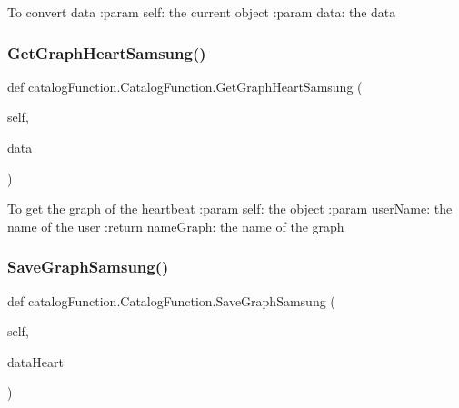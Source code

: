 \begin{DoxyVerb}    To convert data
    :param self: the current object
    :param data: the data
\end{DoxyVerb}
 \mbox{\label{classcatalog_function_1_1_catalog_function_a09b360308d4ce6654cfb88769dfaa52e}} 
\subsubsection{\texorpdfstring{Get\+Graph\+Heart\+Samsung()}{GetGraphHeartSamsung()}}
{\footnotesize\ttfamily def catalog\+Function.\+Catalog\+Function.\+Get\+Graph\+Heart\+Samsung (\begin{DoxyParamCaption}\item[{}]{self,  }\item[{}]{data }\end{DoxyParamCaption})}

\begin{DoxyVerb}    To get the graph of the heartbeat
    :param self: the object
    :param userName: the name of the user
    :return nameGraph: the name of the graph
\end{DoxyVerb}
 \mbox{\label{classcatalog_function_1_1_catalog_function_ae64288ab8ea8adef0057f8147f2607e9}} 
\subsubsection{\texorpdfstring{Save\+Graph\+Samsung()}{SaveGraphSamsung()}}
{\footnotesize\ttfamily def catalog\+Function.\+Catalog\+Function.\+Save\+Graph\+Samsung (\begin{DoxyParamCaption}\item[{}]{self,  }\item[{}]{data\+Heart }\end{DoxyParamCaption})}

